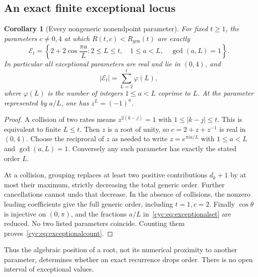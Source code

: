 \documentclass[11pt,a4paper]{article}
\numberwithin{equation}{section}
\newtheorem{corollary}[theorem]{Corollary}
\theoremstyle{definition}
\theoremstyle{remark}
\newcommand{\Rgen}{R_{\mathrm{gen}}}
\begin{document}
\subsection{An exact finite exceptional locus}
\begin{corollary}[Every nongeneric nonendpoint parameter]\label{cyc:cor:locus}
For fixed $t\ge1$, the parameters $c\ne0,4$ at which
$R(t,c)<\Rgen(t)$ are exactly
\begin{equation}\label{cyc:eq:exceptionalset}
 \mathcal E_t=
 \left\{2+2\cos\frac{\pi a}{L}:
       2\le L\le t,\quad 1\le a<L,\quad \gcd(a,L)=1\right\}.
\end{equation}
In particular all exceptional parameters are real and lie in $(0,4)$,
and
\begin{equation}\label{cyc:eq:exceptionalcount}
 |\mathcal E_t|=\sum_{L=2}^{t}\varphi(L),
\end{equation}
where $\varphi(L)$ is the number of integers $1\le a<L$ coprime to $L$.
At the parameter represented by $a/L$, one has $z^L=(-1)^a$.
\end{corollary}
\begin{proof}
A collision of two rates means $z^{2(k-j)}=1$ with
$1\le|k-j|\le t$.  This is equivalent to finite $L\le t$.
Then $z$ is a root of unity, so $c=2+z+z^{-1}$ is real in $(0,4)$.
Choose the reciprocal of $z$ as needed to write
$z=e^{\pi ia/L}$ with $1\le a<L$ and $\gcd(a,L)=1$.
Conversely any such parameter has exactly the stated order $L$.

At a collision, grouping replaces at least two positive contributions
$d_k+1$ by at most their maximum, strictly decreasing the total generic
order.  Further cancellations cannot undo that decrease.  In the
absence of collisions, the nonzero leading coefficients give the
full generic order, including $t=1,c=2$.
Finally $\cos\theta$ is injective on $(0,\pi)$, and the fractions
$a/L$ in~\eqref{cyc:eq:exceptionalset} are reduced.  No two listed
parameters coincide.  Counting them proves~\eqref{cyc:eq:exceptionalcount}.
\end{proof}

Thus the algebraic position of a root, not its numerical proximity to
another parameter, determines whether an exact recurrence drops order.
There is no open interval of exceptional values.
\end{document}
